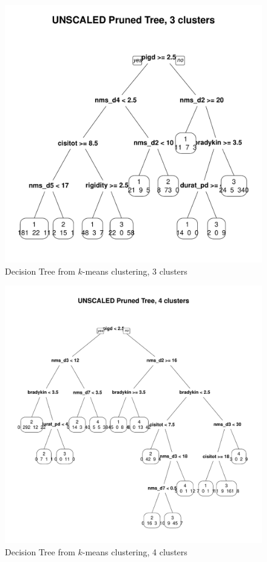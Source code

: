 \documentclass[letterpaper,12pt]{article}
\begin{document}
\begin{figure}[h]
  \centering
  \includegraphics[width=\linewidth]{dtree-kmeans-pruned-unscaled-3.pdf}
  \caption{Decision Tree from $k$-means clustering, 3 clusters}
  \label{fig:kmeans-dtree-3}
\end{figure}

\begin{figure}[h]
  \centering
  \includegraphics[width=\linewidth]{dtree-kmeans-pruned-unscaled-4.pdf}
  \caption{Decision Tree from $k$-means clustering, 4 clusters}
  \label{fig:kmeans-dtree-4}
\end{figure}
\end{document}
